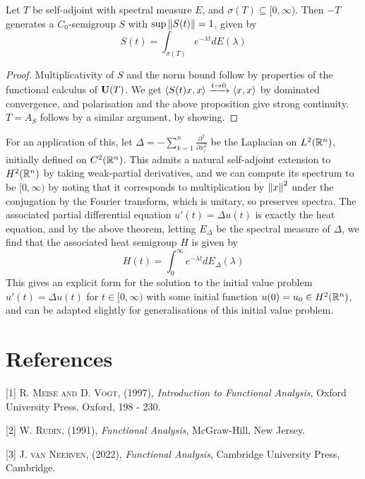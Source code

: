 \documentclass[10pt]{amsart}
\begin{document}
\begin{theorem}
    Let $T$ be self-adjoint with spectral measure $E$, and $\sigma(T) \subseteq [0, \infty)$. Then $-T$ generates a $C_0$-semigroup $S$ with $\sup\left\| S(t) \right\| = 1$, given by
    $$
        S(t) = \int_{\sigma(T)} e^{-\lambda t} dE(\lambda)
    $$
\end{theorem}
\begin{proof}
    Multiplicativity of $S$ and the norm bound follow by properties of the functional calculus of $\mathbf{U}(T)$. We get $\left\langle S(t)x, x \right\rangle \xrightarrow{t \to 0} \left\langle x, x \right\rangle$ by dominated convergence, and polarisation and the above proposition give strong continuity. $T = A_S$ follows by a similar argument, by showing.
\end{proof}
For an application of this, let $\Delta = -\sum_{k = 1}^n \frac{\partial^2}{\partial x_i^2}$ be the Laplacian on $L^2(\mathbb{R}^n)$, initially defined on $C^2(\mathbb{R}^n)$. This admits a natural self-adjoint extension to $H^2(\mathbb{R}^n)$ by taking weak-partial derivatives, and we can compute its spectrum to be $[0, \infty)$ by noting that it corresponds to multiplication by $\left\| x \right\|^2$ under the conjugation by the Fourier transform, which is unitary, so preserves spectra. The associated partial differential equation $u'(t) = \Delta u(t)$ is exactly the heat equation, and by the above theorem, letting $E_\Delta$ be the spectral measure of $\Delta$, we find that the associated heat semigroup $H$ is given by
$$
    H(t) = \int_0^\infty e^{-\lambda t}dE_\Delta(\lambda)
$$
This gives an explicit form for the solution to the initial value problem $u'(t) = \Delta u(t)$ for $t \in [0, \infty)$ with some initial function $u(0) = u_0 \in H^2(\mathbb{R}^n)$, and can be adapted slightly for generalisations of this initial value problem.








\section{References}



[1] \hypertarget{meisevogt}{\textsc{R. Meise and D. Vogt}, (1997), \emph{Introduction to Functional Analysis}, Oxford University Press, Oxford, 198 - 230.}

[2] \hypertarget{rudin}{\textsc{W. Rudin}, (1991), \emph{Functional Analysis}, McGraw-Hill, New Jersey.}

[3] \hypertarget{jvn}{\textsc{J. van Neerven}, (2022), \emph{Functional Analysis}, Cambridge University Press, Cambridge.}

\end{document}
